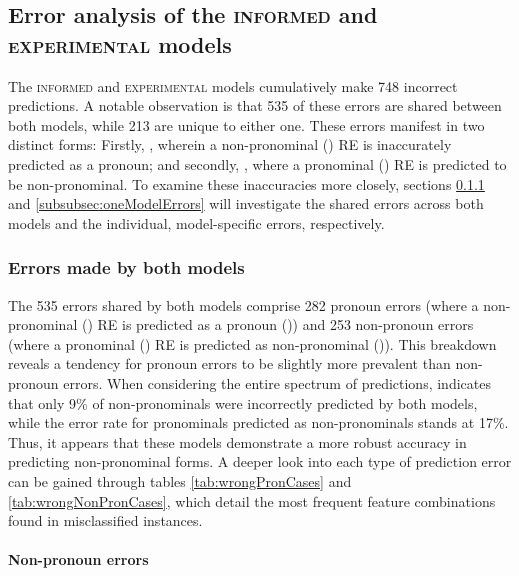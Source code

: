 \subsection{Error analysis of the \textsc{informed} and \textsc{experimental} models}\label{subsec:erroranalysis}

The \textsc{informed} and \textsc{experimental} models cumulatively make 748 incorrect predictions. A notable observation is that 535 of these errors are shared between both models, while 213 are unique to either one. These errors manifest in two distinct forms: Firstly, , wherein a non-pronominal () RE is inaccurately predicted as a pronoun; and secondly, , where a pronominal () RE is predicted to be non-pronominal. To examine these inaccuracies more closely, sections \ref{subsubsec:bothModelErrors} and \ref{subsubsec:oneModelErrors} will investigate the shared errors across both models and the individual, model-specific errors, respectively.

\subsubsection{Errors made by both models}\label{subsubsec:bothModelErrors}
 
The 535 errors shared by both models comprise 282 pronoun errors (where a non-pronominal () RE is predicted as a pronoun ()) and 253 non-pronoun errors (where a pronominal () RE is predicted as non-pronominal ()). This breakdown reveals a tendency for pronoun errors to be slightly more prevalent than non-pronoun errors. When considering the entire spectrum of predictions,  indicates that only 9\% of non-pronominals were incorrectly predicted by both models, while the error rate for pronominals predicted as non-pronominals stands at 17\%. Thus, it appears that these models demonstrate a more robust accuracy in predicting non-pronominal forms. A deeper look into each type of prediction error can be gained through tables \ref{tab:wrongPronCases} and \ref{tab:wrongNonPronCases}, which detail the most frequent feature combinations found in misclassified instances.

{\renewcommand\normalsize{\footnotesize}%
	\normalsize
	}

\paragraph*{Non-pronoun errors}

